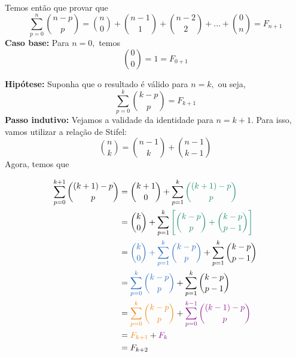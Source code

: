 \documentclass[12pt, a4paper]{article}
\begin{document}
\begin{solution}
Temos então que provar que
\[
\sum\limits_{p = 0}^{n} \binom{n - p}{p} = \binom{n}{0} + \binom{n-1}{1} + \binom{n - 2}{2} + \ldots + \binom{0}{n} = F_{n+1}
\]
\textbf{Caso base:} Para $n = 0,$ temos
\[
\binom{0}{0} = 1 = F_{0+1}
\]

\textbf{Hipótese:} Suponha que o resultado é válido para $n = k,$ ou seja, 
\[
\sum\limits_{p = 0}^{k} \binom{k - p}{p} = F_{k+1}
\]
\textbf{Passo indutivo:} Vejamos a validade da identidade para $n = k + 1.$ Para isso, vamos utilizar a relação de Stifel:
$$
\binom{n}{k}=\binom{n-1}{k}+\binom{n-1}{k-1}
$$
Agora, temos que

\begin{align*}
  \sum\limits_{p = 0}^{k+1} \binom{(k+1) - p}{p} &=\binom{k+1}{0}+\sum_{p=1}^{k}\textcolor{PineGreen}{\binom{(k+1)-p}{p}}\\&=\binom{k}{0}+\sum_{p=1}^{k}\textcolor{PineGreen}{\left[\binom{k-p}{p}+\binom{k-p}{p-1}\right]}\\&=\textcolor{NavyBlue}{\binom{k}{0}+\sum\limits_{p=1}^{k}\binom{k-p}{p}}+\sum\limits_{p=1}^{k}\binom{k-p}{p-1} \\&=\textcolor{NavyBlue}{\sum_{p=0}^{k}\binom{k-p}{p}}+\sum\limits_{p=1}^{k}\binom{k-p}{p-1}\\&=\textcolor{BurntOrange}{\sum_{p=0}^{k}\binom{k-p}{p}}+\textcolor{Plum}{\sum_{p=0}^{k-1}\binom{(k-1)-p}{p}}\\&= \textcolor{BurntOrange}{F_{k+1}} +\textcolor{Plum}{F_k} \\&= F_{k+2}  
\end{align*}


\end{solution}
\end{document}
